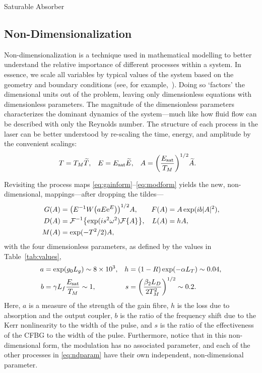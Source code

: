 \documentclass[9pt,twocolumn,twoside]{osajnl}
\let\originalleft\left
\let\originalright\right
\renewcommand{\left}{\mathopen{}\mathclose\bgroup\originalleft}
\renewcommand{\right}{\aftergroup\egroup\originalright}
\newcommand{\Es}{E_{\textrm{sat}}} %
\newcommand{\FT}[1]{\mathcal{F}\left\{ #1 \right\}} %
\newcommand{\FTi}[1]{\mathcal{F}^{-1}\left\{ #1 \right\}} %
\begin{document}
Saturable Absorber \cite{lapre2019, meng2020}

\subsection{Non-Dimensionalization}
Non-dimensionalization is a technique used in mathematical modelling to better understand the relative importance of different processes within a system. In essence, we scale all variables by typical values of the system based on the geometry and boundary conditions (see, for example,~\cite{howison2005}). Doing so `factors' the dimensional units out of the problem, leaving only dimensionless equations with dimensionless parameters. The magnitude of the dimensionless parameters characterizes the dominant dynamics of the system---much like how fluid flow can be described with only the Reynolds number. The structure of each process in the laser can be better understood by re-scaling the time, energy, and amplitude by the convenient scalings:
\begin{align}
	T &= T_M \widetilde{T},& E &= \Es \widetilde{E},& A &= \left( \frac{\Es}{T_M} \right)^{1/2} \widetilde{A}.
\end{align}

Revisiting the process maps \eqref{eq:gainform}--\eqref{eq:modform} yields the new, non-dimensional, mappings---after dropping the tildes---
\begin{align}
	G(A) &= \left(E^{-1} W \left( a E \textrm{e}^{E}\right) \right)^{1/2} A, & F(A) &= A \exp( i b |A|^2), \nonumber \\
	D(A) &= \FTi{\exp( i s^2 \omega^2 ) \FT{A}}, & L(A) &= h A, \label{eq:effects} \\
	M(A) &= \exp( -T^2 / 2 ) A, \nonumber
\end{align}
with the four dimensionless parameters, as defined by the values in Table~\ref{tab:values},
\begin{equation}
	\begin{aligned}
		a &= \exp( g_0 L_g ) \sim 8 \times 10^3, & 
		h &= (1 - R) \exp( - \alpha L_T) \sim 0.04, \\
		b &= \gamma L_f \frac{\Es}{T_M} \sim 1, & s &= \left( \frac{\beta_2 L_D}{2 T_M^2} \right)^{1/2} \sim 0.2.
		\label{eq:ndparam}
	\end{aligned}
\end{equation}
Here, $a$ is a measure of the strength of the gain fibre, $h$ is the loss due to absorption and the output coupler, $b$ is the ratio of the frequency shift due to the Kerr nonlinearity to the width of the pulse, and $s$ is the ratio of the effectiveness of the CFBG to the width of the pulse. Furthermore, notice that in this non-dimensional form, the modulation has no associated parameter, and each of the other processes in \eqref{eq:ndparam} have their own independent, non-dimensional parameter.
\end{document}
